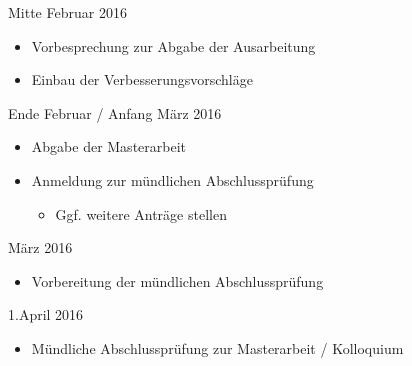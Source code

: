 \documentclass[paper=a4, pagesize, DIV=calc, BCOR=12.5mm, twoside=on, onecolumn=on, open = any, titlepage =on, parskip =half-, headsepline = on, footsepline = on, chapterprefix = on, appendixprefix = off, fontsize = 12pt, numbers = noenddot, abstract = on]{scrbook}
\numberwithin{equation}{chapter}
\begin{document}
Mitte Februar 2016
\begin{itemize}
\item Vorbesprechung zur Abgabe der Ausarbeitung
\item Einbau der Verbesserungsvorschläge
\end{itemize}

Ende Februar / Anfang März 2016
\begin{itemize}
\item Abgabe der Masterarbeit
\item Anmeldung zur mündlichen Abschlussprüfung
\begin{itemize}
\item Ggf. weitere Anträge stellen
\end{itemize}
\end{itemize}

März 2016
\begin{itemize}
\item Vorbereitung der mündlichen Abschlussprüfung
\end{itemize}

1.April 2016
\begin{itemize}
\item Mündliche Abschlussprüfung zur Masterarbeit / Kolloquium
\end{itemize}



\end{document}

